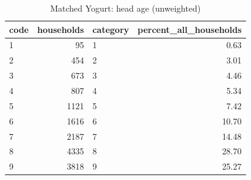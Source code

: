 \begin{table}
\caption{Matched Yogurt: head age (unweighted)}
\begin{tabular}{lrlr}
\toprule
code & households & category & percent\_all\_households \\
\midrule
1 & 95 & 1 & 0.63 \\
2 & 454 & 2 & 3.01 \\
3 & 673 & 3 & 4.46 \\
4 & 807 & 4 & 5.34 \\
5 & 1121 & 5 & 7.42 \\
6 & 1616 & 6 & 10.70 \\
7 & 2187 & 7 & 14.48 \\
8 & 4335 & 8 & 28.70 \\
9 & 3818 & 9 & 25.27 \\
\bottomrule
\end{tabular}
\end{table}
